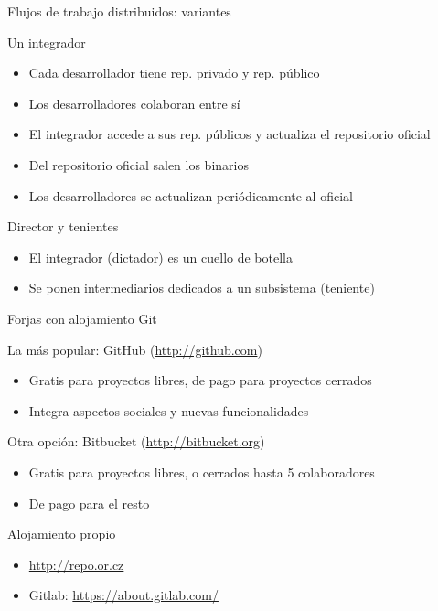 \documentclass[xcolor=svgnames]{beamer}
\begin{document}
\fi

\begin{frame}{Flujos de trabajo distribuidos: variantes}

  \begin{block}{Un integrador}
    \begin{itemize}
    \item Cada desarrollador tiene rep. privado y rep. público
    \item Los desarrolladores colaboran entre sí
    \item El integrador accede a sus rep. públicos y actualiza el
      repositorio oficial
    \item Del repositorio oficial salen los binarios
    \item Los desarrolladores se actualizan periódicamente al oficial
    \end{itemize}
  \end{block}

  \begin{block}{Director y tenientes}
    \begin{itemize}
    \item El integrador (dictador) es un cuello de botella
    \item Se ponen intermediarios dedicados a un subsistema (teniente)
    \end{itemize}
  \end{block}

\end{frame}

\begin{frame}{Forjas con alojamiento Git}

  \begin{block}{La más popular: GitHub (\url{http://github.com})}
    \begin{itemize}
    \item Gratis para proyectos libres, de pago para proyectos cerrados
    \item Integra aspectos sociales y nuevas funcionalidades
    \end{itemize}
  \end{block}

  \begin{block}{Otra opción: Bitbucket (\url{http://bitbucket.org})}
    \begin{itemize}
    \item Gratis para proyectos libres, o cerrados hasta 5 colaboradores
    \item De pago para el resto
    \end{itemize}
  \end{block}

  \begin{block}{Alojamiento propio}
    \begin{itemize}
    \item \url{http://repo.or.cz}
    \item Gitlab: \url{https://about.gitlab.com/}
    \end{itemize}
  \end{block}

\end{frame}
\end{document}
